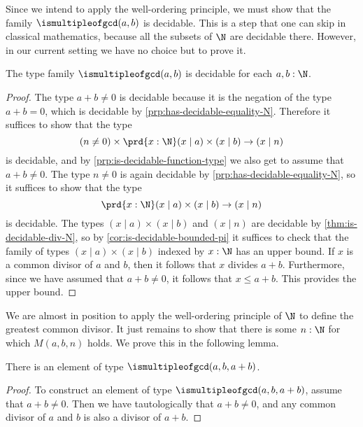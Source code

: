 Since we intend to apply the well-ordering principle, we must show that the family $\ismultipleofgcd(a,b)$ is decidable. This is a step that one can skip in classical mathematics, because all the subsets of $\N$ are decidable there. However, in our current setting we have no choice but to prove it.

\begin{prp}\label{prp:is-decidable-is-multiple-of-gcd}
  The type family $\ismultipleofgcd(a,b)$ is decidable for each $a,b:\N$.
\end{prp}

\begin{proof}
  The type $a+b\neq 0$ is decidable because it is the negation of the type $a+b=0$, which is decidable by \cref{prp:has-decidable-equality-N}. Therefore it suffices to show that the type
  \begin{equation*}
    (n\neq 0)\times \prd{x:\N} (x\mid a)\times (x\mid b)\to (x\mid n)
  \end{equation*}
  is decidable, and by \cref{prp:is-decidable-function-type} we also get to assume that $a+b\neq 0$. The type $n\neq 0$ is again decidable by \cref{prp:has-decidable-equality-N}, so it suffices to show that the type
  \begin{equation*}
    \prd{x:\N}(x\mid a)\times (x\mid b)\to (x\mid n)
  \end{equation*}
  is decidable. The types $(x\mid a)\times(x\mid b)$ and $(x\mid n)$ are decidable by \cref{thm:is-decidable-div-N}, so by \cref{cor:is-decidable-bounded-pi} it suffices to check that the family of types $(x\mid a)\times (x\mid b)$ indexed by $x:\N$ has an upper bound. If $x$ is a common divisor of $a$ and $b$, then it follows that $x$ divides $a+b$. Furthermore, since we have assumed that $a+b\neq 0$, it follows that $x\leq a+b$. This provides the upper bound.
  \end{proof}

We are almost in position to apply the well-ordering principle of $\N$ to define the greatest common divisor. It just remains to show that there is some $n:\N$ for which $M(a,b,n)$ holds. We prove this in the following lemma.

\begin{lem}\label{lem:exists-multiple-of-gcd}
  There is an element of type $\ismultipleofgcd(a,b,a+b)$. 
\end{lem}

\begin{proof}
  To construct an element of type $\ismultipleofgcd(a,b,a+b)$, assume that $a+b\neq 0$. Then we have tautologically that $a+b\neq 0$, and any common divisor of $a$ and $b$ is also a divisor of $a+b$.
\end{proof}

